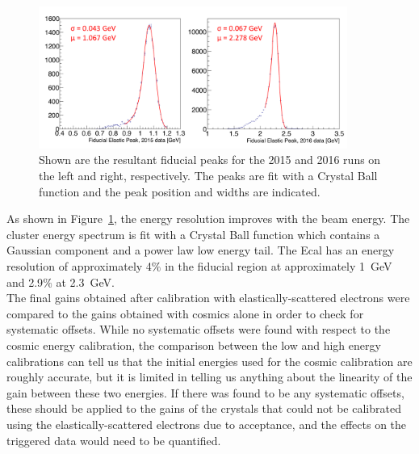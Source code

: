\begin{figure}[H]
  \centering
      \includegraphics[width=0.9\textwidth]{pics/performance/feePeakFid.png}
  \caption[Reconstructed elastic peak in the Ecal for 2015 and 2016 running]{Shown are the resultant fiducial peaks for the 2015 and 2016 runs on the left and right, respectively. The peaks are fit with a Crystal Ball function and the peak position and widths are indicated. }
  \label{Figure:FeeFidPeak}
\end{figure}

As shown in Figure~\ref{Figure:FeeFidPeak}, the energy resolution improves with the beam energy. The cluster energy spectrum is fit with a Crystal Ball function which contains a Gaussian component and a power law low energy tail. The Ecal has an energy resolution of approximately 4$\%$ in the fiducial region at approximately 1~GeV and 2.9$\%$ at 2.3~GeV. \\
\indent The final gains obtained after calibration with elastically-scattered electrons were compared to the gains obtained with cosmics alone in order to check for systematic offsets. While no systematic offsets were found with respect to the cosmic energy calibration, the comparison between the low and high energy calibrations can tell us that the initial energies used for the cosmic calibration are roughly accurate, but it is limited in telling us anything about the linearity of the gain between these two energies. If there was found to be any systematic offsets, these should be applied to the gains of the crystals that could not be calibrated using the elastically-scattered electrons due to acceptance, and the effects on the triggered data would need to be quantified. 

